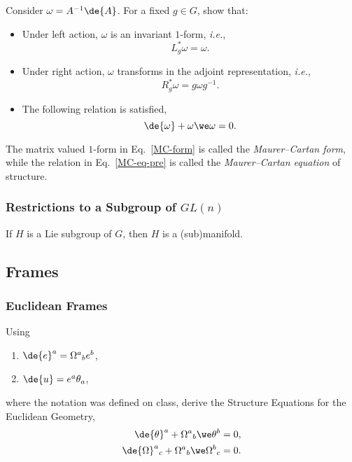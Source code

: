 \begin{Ebox}
  Consider $\omega = A^{-1} \de{A}$. For a fixed $g \in G$, show that:
  \begin{itemize}
  \item Under left action, $\omega$ is an invariant $1$-form, \emph{i.e.},
    \begin{equation}
      L_g^* \omega = \omega.
    \end{equation}
  \item Under right action, $\omega$ transforms in the adjoint representation, \emph{i.e.},
    \begin{equation}
      R_g^* \omega = g\omega g^{-1}.
    \end{equation}
  \item The following relation is satisfied,
    \begin{equation}
      \de{\omega} + \omega \we \omega =0.
      \label{MC-eq-pre}
    \end{equation}
  \end{itemize}
\end{Ebox}

The matrix valued $1$-form in Eq.~\eqref{MC-form} is called the \emph{Maurer--Cartan form}, while the relation in Eq.~\eqref{MC-eq-pre} is called the \emph{Maurer--Cartan equation} of structure.

\subsubsection{Restrictions to a Subgroup of $GL(n)$}

If $H$ is a Lie subgroup of $G$, then $H$ is a (sub)manifold. 

\subsection{Frames}

\subsubsection{Euclidean Frames}

\begin{Ebox}
  Using
  \begin{enumerate}
  \item $\de{e}^a = \Omega^a{}_b e^b$,
  \item $\de{u} = e^a \theta_a$,
  \end{enumerate}
  where the notation was defined on class, derive the Structure Equations for the Euclidean Geometry,
  \begin{align}
    \de{\theta}^a + \Omega^a{}_b \we \theta^b &= 0,\\
    \de{\Omega}^a{}_c + \Omega^a{}_b \we \Omega^b{}_c &= 0.
  \end{align}
\end{Ebox}
